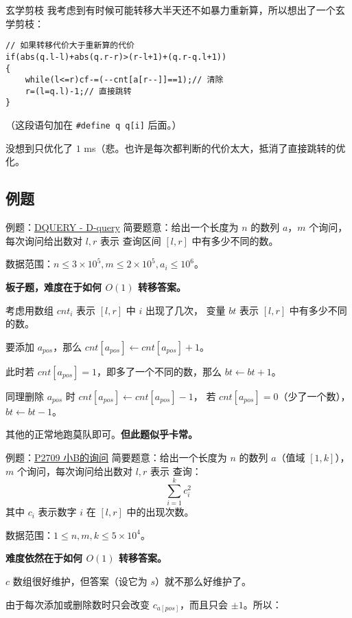 \documentclass[table]{beamer}
\begin{document}
\begin{frame}[fragile]{玄学剪枝}
	我考虑到有时候可能转移大半天还不如暴力重新算，所以想出了一个玄学剪枝：
	\begin{verbatim}
// 如果转移代价大于重新算的代价
if(abs(q.l-l)+abs(q.r-r)>(r-l+1)+(q.r-q.l+1))
{
    while(l<=r)cf-=(--cnt[a[r--]]==1);// 清除
    r=(l=q.l)-1;// 直接跳转
}
\end{verbatim}
	（这段语句加在 \verb|#define q q[i]| 后面。）

	没想到只优化了 $1$ ms（悲。也许是每次都判断的代价太大，抵消了直接跳转的优化。
\end{frame}

\subsection{例题}

\begin{frame}
{例题：{\color{blue}\href{https://www.luogu.com.cn/problem/SP3267}{DQUERY - D-query}}}
	简要题意：给出一个长度为 $n$ 的数列 $a$，$m$ 个询问，每次询问给出数对 $l,r$ 表示
	查询区间 $[l,r]$ 中有多少不同的数。

	数据范围：$n\le 3\times10^5,m\le2\times10^5,a_i\le10^6$。
	\pause

	\textbf{板子题，难度在于如何 $O(1)$ 转移答案。}
	\pause

	考虑用数组 $cnt_i$ 表示 $[l,r]$ 中 $i$ 出现了几次，
	变量 $bt$ 表示 $[l,r]$ 中有多少不同的数。
	
	要添加 $a_{pos}$，那么 $cnt[a_{pos}]\gets cnt[a_{pos}]+1$。

	此时若 $cnt[a_{pos}]=1$，即多了一个不同的数，那么 $bt\gets bt+1$。

	同理删除 $a_{pos}$ 时 $cnt[a_{pos}]\gets cnt[a_{pos}]-1$，
	若 $cnt[a_{pos}]=0$（少了一个数），$bt\gets bt-1$。

	其他的正常地跑莫队即可。\textbf{但此题似乎卡常。}
\end{frame}

\begin{frame}
{例题：{\color{blue}\href{https://www.luogu.com.cn/problem/P2709}{P2709 小B的询问}}}
	简要题意：给出一个长度为 $n$ 的数列 $a$（值域 $[1,k]$），$m$ 个询问，每次询问给出数对 $l,r$ 表示
	查询：  
	$$\sum\limits_{i=1}^k c_i^2$$
	其中 $c_i$ 表示数字 $i$ 在 $[l,r]$ 中的出现次数。  

	数据范围：$1\le n,m,k \le 5\times 10^4$。
	\pause

	\textbf{难度依然在于如何 $O(1)$ 转移答案。}
	\pause

	$c$ 数组很好维护，但答案（设它为 $s$）就不那么好维护了。

	由于每次添加或删除数时只会改变 $c_{a[pos]}$，而且只会 $\pm1$。所以：
\end{frame}
\end{document}
